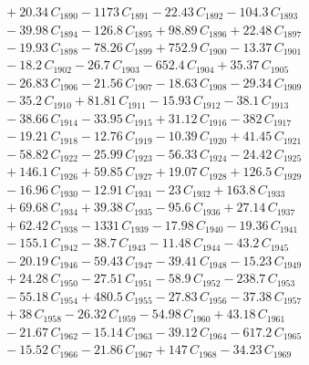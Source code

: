 \documentclass[a4paper,11pt]{article}
\begin{document}
\begin{align}
&\quad + 20.34\,C_{1890} - 1173\,C_{1891} - 22.43\,C_{1892} - 104.3\,C_{1893} \nonumber\\
&\quad - 39.98\,C_{1894} - 126.8\,C_{1895} + 98.89\,C_{1896} + 22.48\,C_{1897} \nonumber\\
&\quad - 19.93\,C_{1898} - 78.26\,C_{1899} + 752.9\,C_{1900} - 13.37\,C_{1901} \nonumber\\
&\quad - 18.2\,C_{1902} - 26.7\,C_{1903} - 652.4\,C_{1904} + 35.37\,C_{1905} \nonumber\\
&\quad - 26.83\,C_{1906} - 21.56\,C_{1907} - 18.63\,C_{1908} - 29.34\,C_{1909} \nonumber\\
&\quad - 35.2\,C_{1910} + 81.81\,C_{1911} - 15.93\,C_{1912} - 38.1\,C_{1913} \nonumber\\
&\quad - 38.66\,C_{1914} - 33.95\,C_{1915} + 31.12\,C_{1916} - 382\,C_{1917} \nonumber\\
&\quad - 19.21\,C_{1918} - 12.76\,C_{1919} - 10.39\,C_{1920} + 41.45\,C_{1921} \nonumber\\
&\quad - 58.82\,C_{1922} - 25.99\,C_{1923} - 56.33\,C_{1924} - 24.42\,C_{1925} \nonumber\\
&\quad + 146.1\,C_{1926} + 59.85\,C_{1927} + 19.07\,C_{1928} + 126.5\,C_{1929} \nonumber\\
&\quad - 16.96\,C_{1930} - 12.91\,C_{1931} - 23\,C_{1932} + 163.8\,C_{1933} \nonumber\\
&\quad + 69.68\,C_{1934} + 39.38\,C_{1935} - 95.6\,C_{1936} + 27.14\,C_{1937} \nonumber\\
&\quad + 62.42\,C_{1938} - 1331\,C_{1939} - 17.98\,C_{1940} - 19.36\,C_{1941} \nonumber\\
&\quad - 155.1\,C_{1942} - 38.7\,C_{1943} - 11.48\,C_{1944} - 43.2\,C_{1945} \nonumber\\
&\quad - 20.19\,C_{1946} - 59.43\,C_{1947} - 39.41\,C_{1948} - 15.23\,C_{1949} \nonumber\\
&\quad + 24.28\,C_{1950} - 27.51\,C_{1951} - 58.9\,C_{1952} - 238.7\,C_{1953} \nonumber\\
&\quad - 55.18\,C_{1954} + 480.5\,C_{1955} - 27.83\,C_{1956} - 37.38\,C_{1957} \nonumber\\
&\quad + 38\,C_{1958} - 26.32\,C_{1959} - 54.98\,C_{1960} + 43.18\,C_{1961} \nonumber\\
&\quad - 21.67\,C_{1962} - 15.14\,C_{1963} - 39.12\,C_{1964} - 617.2\,C_{1965} \nonumber\\
&\quad - 15.52\,C_{1966} - 21.86\,C_{1967} + 147\,C_{1968} - 34.23\,C_{1969} \nonumber\\

\end{align}
\end{document}
